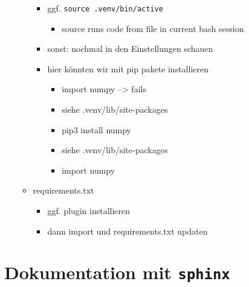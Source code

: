 \begin{itemize}
\begin{itemize}
    \begin{itemize}
    \tightlist
    \item
      ggf. \texttt{source\ .venv/bin/active}

      \begin{itemize}
      \tightlist
      \item
        source runs code from file in current bash session
      \end{itemize}
    \item
      sonst: nochmal in den Einstellungen schauen
    \item
      hier könnten wir mit pip pakete installieren

      \begin{itemize}
      \tightlist
      \item
        import numpy --\textgreater{} fails
      \item
        siehe .venv/lib/site-packages
      \item
        pip3 install numpy
      \item
        siehe .venv/lib/site-packages
      \item
        import numpy
      \end{itemize}
    \end{itemize}
  \item
    requirements.txt

    \begin{itemize}
    \tightlist
    \item
      ggf. plugin installieren
    \item
      dann import und requirements.txt updaten
    \end{itemize}
  \end{itemize}
\end{itemize}

\hypertarget{dokumentation-mit-sphinx}{%
\section{\texorpdfstring{Dokumentation mit
\texttt{sphinx}}{Dokumentation mit sphinx}}\label{dokumentation-mit-sphinx}}

